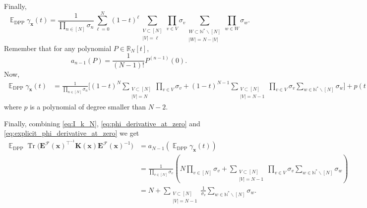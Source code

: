 \documentclass[twoside,11pt]{book}
\numberwithin{theorem}{chapter}
\numberwithin{definition}{chapter}
\numberwithin{proposition}{chapter}
\numberwithin{corollary}{chapter}
\numberwithin{example}{chapter}
\numberwithin{lemma}{chapter}
\numberwithin{assumption}{chapter}
\numberwithin{equation}{chapter}
\numberwithin{figure}{chapter}
\DeclareMathOperator{\Tr}{Tr}
\DeclareMathOperator{\DPP}{\mathrm{DPP}}
\DeclareMathOperator{\Tran}{\intercal}
\DeclareMathOperator{\EX}{\mathbb{E}}
\begin{document}
Finally,
\begin{equation}
\EX_{\DPP} \gamma_{\bm{x}}(t) = \frac{1}{\prod\limits_{n \in [N]}\sigma_n} \sum\limits_{\ell =0}^{N} (1-t)^{\ell} \sum\limits_{\substack{V \subset [N]\\|V| = \ell}} \prod\limits_{v \in V}\sigma_{v}  \sum\limits_{\substack{W \subset \mathbb{N}^{*} \smallsetminus[N]\\  |W|= N-|V|}}  \prod\limits_{w \in W}\sigma_{w}.
\end{equation}
Remember that for any polynomial $P \in \mathbb{R}_{N}[t]$, 
\begin{equation}
a_{n-1}(P) = \frac{1}{(N-1)!}P^{(n-1)}(0).
\end{equation}
Now,
\begin{align}
\EX_{\DPP} \gamma_{\bm{x}}(t) & = \frac{1}{\prod\limits_{n \in [N]}\sigma_n} \Big[ (1-t)^{N} \sum\limits_{\substack{V \subset [N]\\|V| = N}} \prod\limits_{v \in V}\sigma_{v}  + (1-t)^{N-1} \sum\limits_{\substack{V \subset [N]\\|V| = N-1}} \prod\limits_{v \in V}\sigma_{v}  \sum\limits_{w \in \mathbb{N}^{*} \smallsetminus [N]} \sigma_{w} \Big] +p(t),
\end{align}
where $p$ is a polynomial of degree smaller than $N-2$.



Finally, combining \eqref{eq:I_k_N}, \eqref{eq:phi_derivative_at_zero} and \eqref{eq:explicit_phi_derivative_at_zero} we get
\begin{align}
\EX_{\DPP}  \Tr \bigg(  \bm{E}^{\mathcal{F}}(\bm{x})^{\Tran^{-1}}\bm{K}(\bm{x})\bm{E}^{\mathcal{F}}(\bm{x})^{-1} \bigg) & = a_{N-1}(\EX_{\DPP} \gamma_{\bm{x}}(t))\\
& = \frac{1}{\prod\limits_{v \in [N]}\sigma_{v}} \left( N\prod\limits_{v \in [N]}\sigma_{v} + \sum\limits_{\substack{V \subset [N]\\ |V| = N-1}} \prod\limits_{v \in V}\sigma_{v} \sum\limits_{w \in \mathbb{N}^{*}\smallsetminus [N]} \sigma_{w} \right) \nonumber\\
& =  N + \sum\limits_{\substack{V \subset [N]\\ |V| = N-1}} \frac{1}{\sigma_{v}} \sum\limits_{w \in \mathbb{N}^{*}\smallsetminus [N]} \sigma_{w} .
\end{align}
\end{document}
